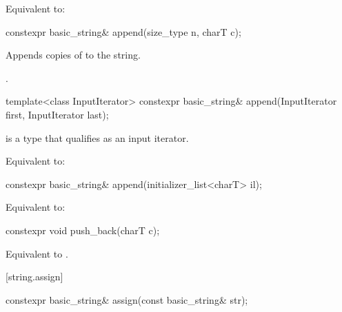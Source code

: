 \begin{itemdescr}
\pnum
\effects
Equivalent to: 
\end{itemdescr}

%
\begin{itemdecl}
constexpr basic_string& append(size_type n, charT c);
\end{itemdecl}

\begin{itemdescr}
\pnum
\effects
Appends  copies of  to the string.

\pnum
\returns
{}.
\end{itemdescr}

%
\begin{itemdecl}
template<class InputIterator>
  constexpr basic_string& append(InputIterator first, InputIterator last);
\end{itemdecl}

\begin{itemdescr}
\pnum
\constraints
{} is a type that qualifies as an input
iterator.

\pnum
\effects
Equivalent to: 
\end{itemdescr}

%
\begin{itemdecl}
constexpr basic_string& append(initializer_list<charT> il);
\end{itemdecl}

\begin{itemdescr}
\pnum
\effects
Equivalent to: 
\end{itemdescr}

%
\begin{itemdecl}
constexpr void push_back(charT c);
\end{itemdecl}

\begin{itemdescr}
\pnum
\effects
Equivalent to
.
\end{itemdescr}

[string.assign]{}

%
\begin{itemdecl}
constexpr basic_string& assign(const basic_string& str);
\end{itemdecl}

